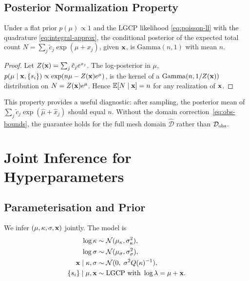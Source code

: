 \documentclass[11pt]{article}
\begin{document}
\subsection{Posterior Normalization Property}
\label{sec:gamma-posterior}

\begin{proposition}
Under a flat prior $p(\mu) \propto 1$ and the LGCP likelihood \eqref{eq:poisson-ll}
with the quadrature \eqref{eq:integral-approx}, the conditional posterior of the
expected total count $N = \sum_j \tilde{c}_j \exp(\mu + x_j)$, given $\mathbf{x}$, is
$\mathrm{Gamma}(n, 1)$ with mean $n$.
\end{proposition}

\begin{proof}
Let $Z(\mathbf{x}) = \sum_j \tilde{c}_j e^{x_j}$.  The log-posterior in $\mu$,
$p(\mu \mid \mathbf{x}, \{s_i\}) \propto \exp(n\mu - Z(\mathbf{x}) e^\mu)$,
is the kernel of a $\mathrm{Gamma}(n, 1/Z(\mathbf{x}))$ distribution on
$N = Z(\mathbf{x})e^\mu$.  Hence $\mathbb{E}[N \mid \mathbf{x}] = n$ for any realization of
$\mathbf{x}$.
\end{proof}

This property provides a useful diagnostic: after sampling, the posterior mean
of $\sum_j \tilde{c}_j \exp(\hat\mu + \hat x_j)$ should equal $n$.  Without
the domain correction~\eqref{eq:obs-bounds}, the guarantee holds for the full
mesh domain $\hat{\mathcal{D}}$ rather than $\mathcal{D}_{\rm obs}$.
\section{Joint Inference for Hyperparameters}
\label{sec:hyperparams}

\subsection{Parameterisation and Prior}

We infer $(\mu, \kappa, \sigma, \mathbf{x})$ jointly.  The model is
\begin{align}
  \log\kappa &\sim \mathcal{N}(\mu_\kappa, \sigma_\kappa^2), \\
  \log\sigma  &\sim \mathcal{N}(\mu_\sigma, \sigma_\sigma^2), \\
  \mathbf{x} \mid \kappa, \sigma &\sim \mathcal{N}(0,\; \sigma^2 Q(\kappa)^{-1}), \\
  \{s_i\} \mid \mu, \mathbf{x} &\sim \text{LGCP with } \log\lambda = \mu + \mathbf{x}.
  \label{eq:model}
\end{align}
\end{document}
